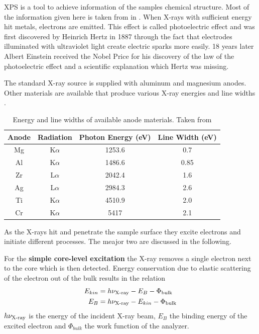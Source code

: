 \label{section:XPS} XPS is a tool to achieve information of the samples chemical structure.
Most of the information given here is taken from \cite{Riviere_90} in \cite{briggs_auger_1990}.
When X-rays with sufficient energy hit metals, electrons are emitted. This effect is called photoelectric effect and was first discovered by Heinrich Hertz in 1887 through the fact that electrodes illuminated with ultraviolet light create electric sparks more easily\cite{hertz_ueber_1887}. 18 years later Albert Einstein received the Nobel Price for his discovery of the law of the photoelectric effect\cite{_nobel_2015} and a scientific explanation which Hertz was missing.

The standard X-ray source is supplied with aluminum and magnesium anodes. Other materials are available that produce various X-ray energies and line widths  \cite{_x-ray_2015}. 
\begin{table}\caption{Energy and line widths of available anode materials. Taken from }
	\centering
	\begin{tabular}{cccc}
		Anode 	& 	Radiation 	& Photon Energy (eV) 	& Line Width (eV) \\ \hline
		Mg	&	K$\alpha$ 	&	1253.6	&	0.7\\
		Al	&	K$\alpha$ 	&	1486.6 	&	0.85\\
		Zr 	&	L$\alpha$ 	&	2042.4 	&	1.6\\
		Ag 	&	L$\alpha$ 	&	2984.3 	&	2.6\\
		Ti 	&	K$\alpha$ 	&	4510.9 	&	2.0\\
		Cr	&	K$\alpha$ 	&	5417 	&	2.1\\
	\end{tabular}
\end{table}

As the X-rays hit and penetrate the sample surface they excite electrons and initiate different processes. The meajor two are discussed in the following.

For the \textbf{simple core-level excitation} the X-ray removes a single electron next to the core which is then detected. Energy conservation due to elastic scattering of the electron out of the bulk results in the relation 
\begin{align}
E_{kin} &= h\nu_{\textnormal{X-ray}}-E_{B}-\Phi_{\textnormal{bulk}} \\
E_B 	&=h\nu_{\textnormal{X-ray}}-E_{kin}-\Phi_{\textnormal{bulk}}
\end{align}
 $h\nu_{\textnormal{X-ray}}$ is the energy of the incident X-ray beam, $E_B$ the binding energy of the excited electron and $\Phi_{bulk}$ the work function of the analyzer. 
 
